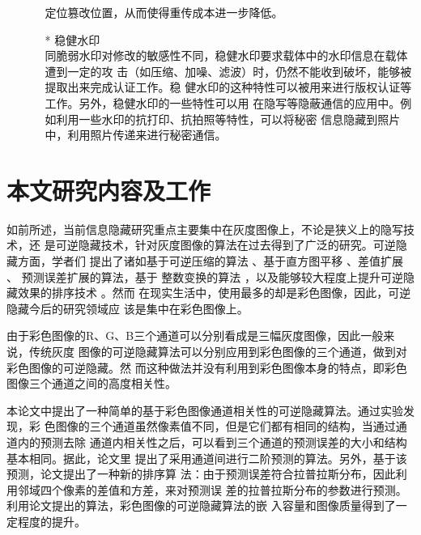 \begin{itemize}
\begin{itemize}
  定位篡改位置，从而使得重传成本进一步降低。
  \par
  \item[*] 稳健水印\\
  同脆弱水印对修改的敏感性不同，稳健水印要求载体中的水印信息在载体遭到一定的攻
  击（如压缩、加噪、滤波）时，仍然不能收到破坏，能够被提取出来完成认证工作。稳
  健水印的这种特性可以被用来进行版权认证等工作。另外，稳健水印的一些特性可以用
  在隐写等隐蔽通信的应用中。例如利用一些水印的抗打印、抗拍照等特性，可以将秘密
  信息隐藏到照片中，利用照片传递来进行秘密通信。
  \par
  \end{itemize}
\end{itemize}



\section{本文研究内容及工作}
\label{s:contribution_of_this_thesis}
如前所述，当前信息隐藏研究重点主要集中在灰度图像上，不论是狭义上的隐写技术，还
是可逆隐藏技术，针对灰度图像的算法在过去得到了广泛的研究。可逆隐藏方面，学者们
提出了诸如基于可逆压缩的算法\cite{fridrich2001invertible}\cite{fridrich1900lossless}
\cite{celik2005lossless}、基于直方图平移\cite{ni2006reversible}
\cite{lee2006reversiblee}\cite{li2013general}、差值扩展\cite{tian2003reversible}
\cite{alattar2003reversible}\cite{alattar2004reversible}\cite{alattar2004reversible}、
预测误差扩展的算法\cite{thodi2007expansion}\cite{fallahpour2008reversible}，基于
整数变换的算法\cite{coltuc2007very}\cite{chen2010reversible}\cite{wang2010efficient}
\cite{peng2012adaptive}，以及能够较大程度上提升可逆隐藏效果的排序技术
\cite{kamstra2005reversible}\cite{sachnev2009reversible}\cite{li2013high}。然而
在现实生活中，使用最多的却是彩色图像，因此，可逆隐藏今后的研究领域应
该是集中在彩色图像上。
\par
由于彩色图像的R、G、B三个通道可以分别看成是三幅灰度图像，因此一般来说，传统灰度
图像的可逆隐藏算法可以分别应用到彩色图像的三个通道，做到对彩色图像的可逆隐藏。然
而这种做法并没有利用到彩色图像本身的特点，即彩色图像三个通道之间的高度相关性。
\par
本论文中提出了一种简单的基于彩色图像通道相关性的可逆隐藏算法。通过实验发现，彩
色图像的三个通道虽然像素值不同，但是它们都有相同的结构，当通过通道内的预测去除
通道内相关性之后，可以看到三个通道的预测误差的大小和结构基本相同。据此，论文里
提出了采用通道间进行二阶预测的算法。另外，基于该预测，论文提出了一种新的排序算
法：由于预测误差符合拉普拉斯分布，因此利用邻域四个像素的差值和方差，来对预测误
差的拉普拉斯分布的参数进行预测。利用论文提出的算法，彩色图像的可逆隐藏算法的嵌
入容量和图像质量得到了一定程度的提升。
\par



